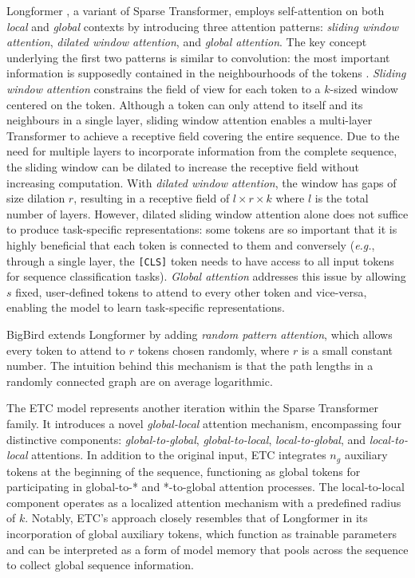 Longformer \citep{beltagy2020longformer}, a variant of Sparse Transformer, employs self-attention on both \textit{local} and \textit{global} contexts by introducing three attention patterns: \textit{sliding window attention}, \textit{dilated window attention}, and \textit{global attention}. The key concept underlying the first two patterns is similar to convolution: the most important information is supposedly contained in the neighbourhoods of the tokens \citep{liu2022leveraging}. \textit{Sliding window attention} constrains the field of view for each token to a $k$-sized window centered on the token. Although a token can only attend to itself and its neighbours in a single layer, sliding window attention enables a multi-layer Transformer to achieve a receptive field covering the entire sequence. Due to the need for multiple layers to incorporate information from the complete sequence, the sliding window can be dilated to increase the receptive field without increasing computation. With \textit{dilated window attention}, the window has gaps of size dilation $r$, resulting in a receptive field of $l \times r \times k$ where $l$ is the total number of layers. However, dilated sliding window attention alone does not suffice to produce task-specific representations: some tokens are so important that it is highly beneficial that each token is connected to them and conversely (\textit{e.g.}, through a single layer, the \texttt{[CLS]} token needs to have access to all input tokens for sequence classification tasks). \textit{Global attention} addresses this issue by allowing $s$ fixed, user-defined tokens to attend to every other token and vice-versa, enabling the model to learn task-specific representations. 

BigBird \citep{zaheer2020big} extends Longformer by adding \textit{random pattern attention}, which allows every token to attend to $r$ tokens chosen randomly, where $r$ is a small constant number. The intuition behind this mechanism is that the path lengths in a randomly connected graph are on average logarithmic. 

The \ac{ETC} model \citep{ainslie2020etc} represents another iteration within the Sparse Transformer family. It introduces a novel \textit{global-local} attention mechanism, encompassing four distinctive components: \textit{global-to-global}, \textit{global-to-local}, \textit{local-to-global}, and \textit{local-to-local} attentions. In addition to the original input, \ac{ETC} integrates $n_g$ auxiliary tokens at the beginning of the sequence, functioning as global tokens for participating in global-to-* and *-to-global attention processes. The local-to-local component operates as a localized attention mechanism with a predefined radius of $k$. Notably, \ac{ETC}'s approach closely resembles that of Longformer in its incorporation of global auxiliary tokens, which function as trainable parameters and can be interpreted as a form of model memory that pools across the sequence to collect global sequence information. 

